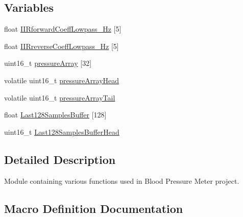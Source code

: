\subsection*{Variables}
\begin{DoxyCompactItemize}
\item 
float \mbox{\hyperlink{group___blood_pressure_meter_functions_ga1e92871ee98293f1d075406d7192be32_ga1e92871ee98293f1d075406d7192be32}{I\+I\+Rforward\+Coeff\+Lowpass\+\_\+Hz}} \mbox{[}5\mbox{]}
\item 
float \mbox{\hyperlink{group___blood_pressure_meter_functions_gaddb6d7546a8db3fa284d91704a0b65db_gaddb6d7546a8db3fa284d91704a0b65db}{I\+I\+Rreverse\+Coeff\+Lowpass\+\_\+Hz}} \mbox{[}5\mbox{]}
\item 
uint16\+\_\+t \mbox{\hyperlink{group___blood_pressure_meter_functions_ga074212e81e34d1ed11bfa7238aaa15d0_ga074212e81e34d1ed11bfa7238aaa15d0}{pressure\+Array}} \mbox{[}32\mbox{]}
\item 
volatile uint16\+\_\+t \mbox{\hyperlink{group___blood_pressure_meter_functions_ga6d2134561d1dccfb4152d385d48c7242_ga6d2134561d1dccfb4152d385d48c7242}{pressure\+Array\+Head}}
\item 
volatile uint16\+\_\+t \mbox{\hyperlink{group___blood_pressure_meter_functions_ga9c328ec15068b921509854dfaa0adaea_ga9c328ec15068b921509854dfaa0adaea}{pressure\+Array\+Tail}}
\item 
float \mbox{\hyperlink{group___blood_pressure_meter_functions_ga0d23611e28c2af8552ef0fdf90acb469_ga0d23611e28c2af8552ef0fdf90acb469}{Last128\+Samples\+Buffer}} \mbox{[}128\mbox{]}
\item 
uint16\+\_\+t \mbox{\hyperlink{group___blood_pressure_meter_functions_gaac39a92229e25e30da63f20928f6c46b_gaac39a92229e25e30da63f20928f6c46b}{Last128\+Samples\+Buffer\+Head}}
\end{DoxyCompactItemize}


\subsection{Detailed Description}
Module containing various functions used in Blood Pressure Meter project. 



\subsection{Macro Definition Documentation}
\mbox{\label{group___blood_pressure_meter_functions_gabc2ad14f0789907024ac765711ffd3da_gabc2ad14f0789907024ac765711ffd3da}} 
